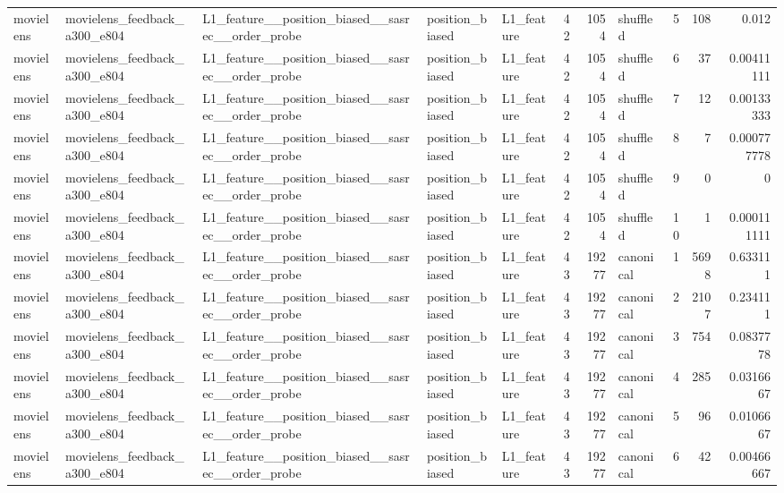 \begin{table}[htbp!]
\begin{tabular}{lllllrrlrrr}
movielens & movielens\_feedback\_a300\_e804 & L1\_feature\_\_position\_biased\_\_sasrec\_\_order\_probe & position\_biased & L1\_feature & 42 & 1054 & shuffled & 5 & 108 & 0.012 \\
movielens & movielens\_feedback\_a300\_e804 & L1\_feature\_\_position\_biased\_\_sasrec\_\_order\_probe & position\_biased & L1\_feature & 42 & 1054 & shuffled & 6 & 37 & 0.00411111 \\
movielens & movielens\_feedback\_a300\_e804 & L1\_feature\_\_position\_biased\_\_sasrec\_\_order\_probe & position\_biased & L1\_feature & 42 & 1054 & shuffled & 7 & 12 & 0.00133333 \\
movielens & movielens\_feedback\_a300\_e804 & L1\_feature\_\_position\_biased\_\_sasrec\_\_order\_probe & position\_biased & L1\_feature & 42 & 1054 & shuffled & 8 & 7 & 0.000777778 \\
movielens & movielens\_feedback\_a300\_e804 & L1\_feature\_\_position\_biased\_\_sasrec\_\_order\_probe & position\_biased & L1\_feature & 42 & 1054 & shuffled & 9 & 0 & 0 \\
movielens & movielens\_feedback\_a300\_e804 & L1\_feature\_\_position\_biased\_\_sasrec\_\_order\_probe & position\_biased & L1\_feature & 42 & 1054 & shuffled & 10 & 1 & 0.000111111 \\
movielens & movielens\_feedback\_a300\_e804 & L1\_feature\_\_position\_biased\_\_sasrec\_\_order\_probe & position\_biased & L1\_feature & 43 & 19277 & canonical & 1 & 5698 & 0.633111 \\
movielens & movielens\_feedback\_a300\_e804 & L1\_feature\_\_position\_biased\_\_sasrec\_\_order\_probe & position\_biased & L1\_feature & 43 & 19277 & canonical & 2 & 2107 & 0.234111 \\
movielens & movielens\_feedback\_a300\_e804 & L1\_feature\_\_position\_biased\_\_sasrec\_\_order\_probe & position\_biased & L1\_feature & 43 & 19277 & canonical & 3 & 754 & 0.0837778 \\
movielens & movielens\_feedback\_a300\_e804 & L1\_feature\_\_position\_biased\_\_sasrec\_\_order\_probe & position\_biased & L1\_feature & 43 & 19277 & canonical & 4 & 285 & 0.0316667 \\
movielens & movielens\_feedback\_a300\_e804 & L1\_feature\_\_position\_biased\_\_sasrec\_\_order\_probe & position\_biased & L1\_feature & 43 & 19277 & canonical & 5 & 96 & 0.0106667 \\
movielens & movielens\_feedback\_a300\_e804 & L1\_feature\_\_position\_biased\_\_sasrec\_\_order\_probe & position\_biased & L1\_feature & 43 & 19277 & canonical & 6 & 42 & 0.00466667 \\

\end{tabular}
\end{table}
